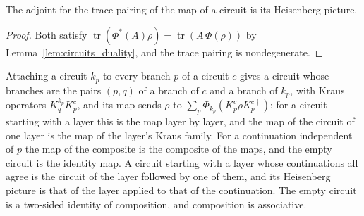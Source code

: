 \begin{lemma}
    \label{lem:circuits_trace_adjoint}
    \leanok
    The adjoint for the trace pairing of the map of a circuit is its Heisenberg picture.
\end{lemma}
\begin{proof}\leanok
    Both satisfy $\operatorname{tr}(\Phi^*(A)\rho)=\operatorname{tr}(A\,\Phi(\rho))$ by
    Lemma~\ref{lem:circuits_duality}, and the trace pairing is nondegenerate.
\end{proof}

\begin{theorem}[Composition]
    \label{thm:circuits_composition}
    \leanok
    Attaching a circuit $k_p$ to every branch $p$ of a circuit $c$ gives a circuit
    whose branches are the pairs $(p,q)$ of a branch of $c$ and a branch of $k_p$,
    with Kraus operators $K^{k_p}_qK^c_p$, and its map sends $\rho$ to
    $\sum_p\Phi_{k_p}(K^c_p\rho K^{c\dagger}_p)$; for a circuit starting with a layer
    this is the map layer by layer, and the map of the circuit of one layer is the map
    of the layer's Kraus family. For a continuation independent of $p$ the map of the
    composite is the composite of the maps, and the empty circuit is the identity map. A
    circuit starting with a layer whose continuations all agree is the circuit of the
    layer followed by one of them, and its Heisenberg picture is that of the layer
    applied to that of the continuation. The empty circuit is a two-sided identity of
    composition, and composition is associative.
\end{theorem}
